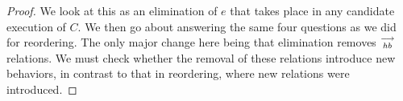 \begin{proof}
    We look at this as an elimination of $e$ that takes place in any candidate execution of $C$. 
    We then go about answering the same four questions as we did for reordering. 
    The only major change here being that elimination removes $\stackrel{\longrightarrow}{_{hb}}$ relations.
    We must check whether the removal of these relations introduce new behaviors, in contrast to that in reordering, where new relations were introduced. 
    
    
    
    
    
    
\end{proof}